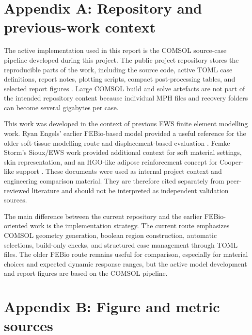\appendix
\section*{Appendix A: Repository and previous-work context}
\label{sec:appendix_repository_previous_work}

The active implementation used in this report is the COMSOL source-case pipeline developed during this project. The public project repository stores the reproducible parts of the work, including the source code, active TOML case definitions, report notes, plotting scripts, compact post-processing tables, and selected report figures \cite{KuijpersEWSComsolGitHub}. Large COMSOL build and solve artefacts are not part of the intended repository content because individual MPH files and recovery folders can become several gigabytes per case.

This work was developed in the context of previous EWS finite element modelling work. Ryan Engels' earlier FEBio-based model provided a useful reference for the older soft-tissue modelling route and displacement-based evaluation \cite{EngelsEWSReport}. Femke Storm's Sioux/EWS work provided additional context for soft material settings, skin representation, and an HGO-like adipose reinforcement concept for Cooper-like support \cite{StormEWSReport}. These documents were used as internal project context and engineering comparison material. They are therefore cited separately from peer-reviewed literature and should not be interpreted as independent validation sources.

The main difference between the current repository and the earlier FEBio-oriented work is the implementation strategy. The current route emphasizes COMSOL geometry generation, boolean region construction, automatic selections, build-only checks, and structured case management through TOML files. The older FEBio route remains useful for comparison, especially for material choices and expected dynamic response ranges, but the active model development and report figures are based on the COMSOL pipeline.

\section*{Appendix B: Figure and metric sources}
\label{sec:appendix_figures}

